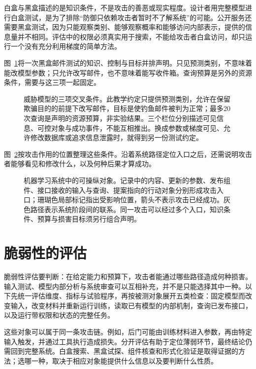 白盒与黑盒描述的是知识条件，不是攻击的善恶或现实程度。设计者用完整模型进行白盒测试，是为了排除“防御只依赖攻击者暂时不了解系统”的可能。公开服务还需要黑盒测试，因为只能观察类别、能够观察概率和能够访问内部表示，提供的信息量并不相同。评估中的权限必须真实用于搜索，不能给攻击者白盒访问，却只运行一个没有充分利用梯度的简单方法。

图~\ref{fig:trust-threat-model-coordinates}将一次黑盒邮件测试的知识、控制与目标并排声明。只见预测类别，不意味着能改模型参数；只允许改写邮件，也不意味着能写收件箱。查询预算是另外的资源条件，需要与这三项一起固定。

\begin{figure}[!htb]
  \centering
  
  \caption{威胁模型的三项交叉条件。此教学约定只提供预测类别，允许在保留欺骗目的的前提下改写邮件，目标是使钓鱼邮件被判为正常；最多20次查询是声明的资源预算，非实验结果。三个栏位分别描述可见信息、可控对象与成功事件，不能互相推出。换成参数或梯度可见、允许修改数据库或追求信息泄露时，就得到另一份测试约定。}
  \label{fig:trust-threat-model-coordinates}
\end{figure}

图~\ref{fig:trust-security-entrypoints}按攻击作用的位置整理这些条件。沿着系统路径定位入口之后，还需说明攻击者能够看见和修改什么，以及何种后果才算成功。

\begin{figure}[htbp]
  \centering
  
  \caption{机器学习系统中的可操纵对象。记录中的内容、更新的参数、发布组件、接口接收的输入与查询、提案指向的行动对象分别形成攻击入口；珊瑚色局部标记指出受影响位置，箭头不表示攻击已经成功。灰色路径表示系统阶段间的联系。同一攻击可以经过多个入口，知识条件、预算与损害目标须另行组合声明。}
  \label{fig:trust-security-entrypoints}
\end{figure}

\section{脆弱性的评估}
\label{sec:security-evaluation}

脆弱性评估要判断：在给定能力和预算下，攻击者能通过哪些路径造成何种损害。输入测试、模型内部分析与系统审查可以互相补充，并不是只能选择其中一种。以下先统一评估维度、指标与试验程序，再按被测对象展开五类检查：固定模型而改变输入，改变材料并重新运行训练，读取已有模型的内部机制，查询已发布接口，以及运行带权限和状态的完整任务。

这些对象可以属于同一条攻击链。例如，后门可能由训练材料进入参数，再由特定输入触发，并通过工具执行造成损失。分开评估有助于定位薄弱环节，最终结论仍需回到完整系统。白盒搜索、黑盒试探、组件核查和形式化验证是取得证据的方法；选哪一种，取决于相应对象能提供什么信息以及要判断什么性质。

